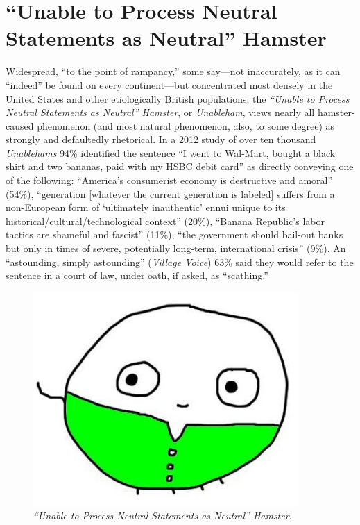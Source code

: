 \documentclass[10pt,twoside,openright]{memoir}
\begin{document}
\chapter*{``Unable to Process Neutral Statements as Neutral'' Hamster}
Widespread, ``to the point of rampancy,'' some say---not inaccurately, as it can
``indeed'' be found on every continent---but concentrated most densely in the
United States and other etiologically British populations, the {\em``Unable to
Process Neutral Statements as Neutral'' Hamster}, or {\em Unableham}, views
nearly all hamster-caused phenomenon (and most natural phenomenon, also, to some
degree) as strongly and defaultedly rhetorical. In a 2012 study of over ten
thousand {\em Unablehams} 94\% identified the sentence ``I went to Wal-Mart,
bought a black shirt and two bananas, paid with my HSBC debit card'' as directly
conveying one of the following: ``America's consumerist economy is destructive
and amoral'' (54\%), ``generation [whatever the current generation is labeled]
suffers from a non-European form of `ultimately inauthentic' ennui unique to
its historical/cultural/technological context'' (20\%), ``Banana Republic's
labor tactics are shameful and fascist'' (11\%), ``the government should
bail-out banks but only in times of severe, potentially long-term, international
crisis'' (9\%). An ``astounding, simply astounding'' ({\em Village Voice}) 63\%
said they would refer to the sentence in a court of law, under oath, if asked,
as ``scathing.'' 
\begin{figure}[t!]
\begin{center}
\includegraphics[width=0.9\textwidth]{img/unableham}
\end{center}
\caption*{{\em ``Unable to Process Neutral Statements as Neutral'' Hamster}.}
\end{figure}
\end{document}
